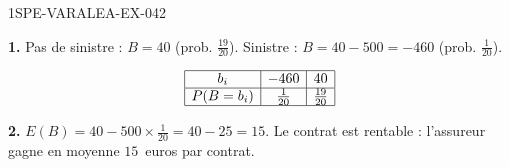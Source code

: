 \begin{corrige}{1SPE-VARALEA-EX-042}

\textbf{1.} Pas de sinistre : $B = 40$ (prob. $\frac{19}{20}$). Sinistre : $B = 40 - 500 = -460$ (prob. $\frac{1}{20}$).

\[
\begin{array}{|c|c|c|}
\hline
b_i & -460 & 40 \\
\hline
P(B=b_i) & \frac{1}{20} & \frac{19}{20} \\
\hline
\end{array}
\]

\medskip
\textbf{2.} $E(B) = 40 - 500 \times \frac{1}{20} = 40 - 25 = 15$. Le contrat est rentable : l'assureur gagne en moyenne $15$~euros par contrat.

\end{corrige}
